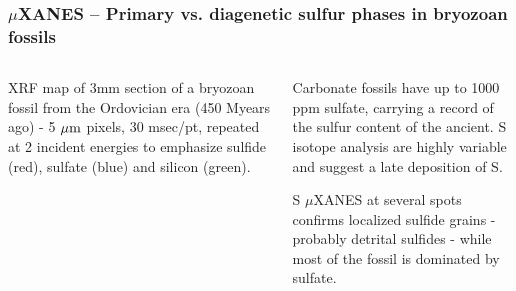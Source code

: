 \begin{frame}\frametitle{${\mu}$XANES --  Primary vs. diagenetic sulfur phases in  bryozoan fossils}

  \begin{columns}[T]
    \begin{column}{60mm}
      {}

      \begin{minipage}{60mm}
        XRF map of 3mm section of a bryozoan fossil from the Ordovician era
        (450 Myears ago) - 5 $\rm{\mu}m$ pixels, 30 msec/pt, repeated at 2
        incident energies to emphasize sulfide (red), sulfate (blue) and
        silicon (green).
        \end{minipage}
      \vmm

      {\small{}}
    \end{column}
    \begin{column}{55mm}

      \begin{minipage}{55mm}
        Carbonate fossils have up to 1000 ppm sulfate, carrying a record of
        the sulfur content of the ancient.  S isotope analysis are highly
        variable and suggest a late deposition of S.
        \end{minipage}

        {}

      \begin{minipage}{55mm}
        S $\mu$XANES at several spots confirms localized sulfide grains -
        probably detrital sulfides - while most of the fossil is dominated by
        sulfate.
        \end{minipage}
    \end{column}
  \end{columns}
\end{frame}


